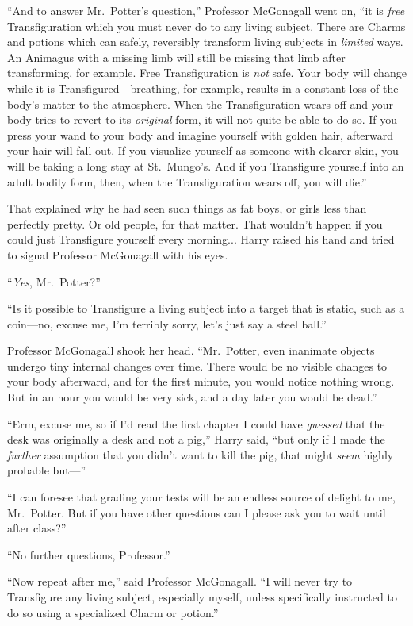 “And to answer Mr.~Potter’s question,” Professor McGonagall went on, “it is \emph{free} Transfiguration which you must never do to any living subject. There are Charms and potions which can safely, reversibly transform living subjects in \emph{limited} ways. An Animagus with a missing limb will still be missing that limb after transforming, for example. Free Transfiguration is \emph{not} safe. Your body will change while it is Transfigured—breathing, for example, results in a constant loss of the body’s matter to the atmosphere. When the Transfiguration wears off and your body tries to revert to its \emph{original} form, it will not quite be able to do so. If you press your wand to your body and imagine yourself with golden hair, afterward your hair will fall out. If you visualize yourself as someone with clearer skin, you will be taking a long stay at St.~Mungo’s. And if you Transfigure yourself into an adult bodily form, then, when the Transfiguration wears off, you will die.”

That explained why he had seen such things as fat boys, or girls less than perfectly pretty. Or old people, for that matter. That wouldn’t happen if you could just Transfigure yourself every morning... Harry raised his hand and tried to signal Professor McGonagall with his eyes.

“\emph{Yes}, Mr.~Potter?”

“Is it possible to Transfigure a living subject into a target that is static, such as a coin—no, excuse me, I’m terribly sorry, let’s just say a steel ball.”

Professor McGonagall shook her head. “Mr.~Potter, even inanimate objects undergo tiny internal changes over time. There would be no visible changes to your body afterward, and for the first minute, you would notice nothing wrong. But in an hour you would be very sick, and a day later you would be dead.”

“Erm, excuse me, so if I’d read the first chapter I could have \emph{guessed} that the desk was originally a desk and not a pig,” Harry said, “but only if I made the \emph{further} assumption that you didn’t want to kill the pig, that might \emph{seem} highly probable but—”

“I can foresee that grading your tests will be an endless source of delight to me, Mr.~Potter. But if you have other questions can I please ask you to wait until after class?”

“No further questions, Professor.”

“Now repeat after me,” said Professor McGonagall. “I will never try to Transfigure any living subject, especially myself, unless specifically instructed to do so using a specialized Charm or potion.”

